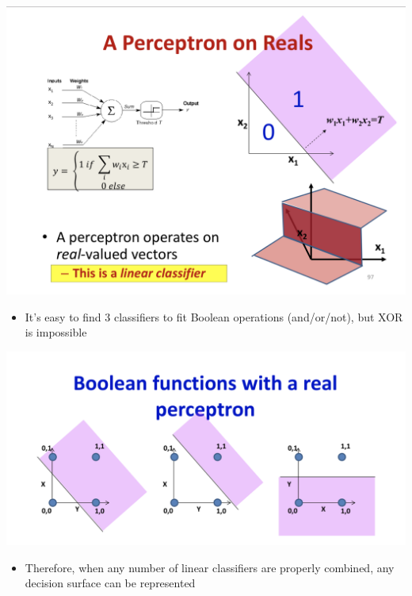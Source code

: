 \documentclass{article}
\begin{document}
	\includegraphics[scale=0.2]{5.png}
	
	
	\begin{itemize}
		\item It's easy to find 3 classifiers to fit Boolean operations (and/or/not), but XOR is impossible
	\end{itemize}

	\includegraphics[scale=0.2]{6.png}
	
	\begin{itemize}
		\item Therefore, when any number of linear classifiers are properly combined, any decision surface can be represented
	\end{itemize}
	
\end{document}
